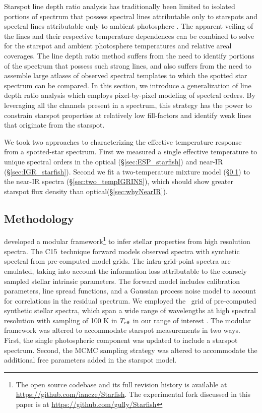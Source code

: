 \documentclass[twocolumn]{emulateapj}%
\newcommand{\iancze}{{\sc C15}}
\begin{document}
Starspot line depth ratio analysis has traditionally been limited to isolated portions of spectrum that possess spectral lines attributable only to starspots and spectral lines attributable only to ambient photosphere \citep[\emph{e.g.}][]{neff95, oneal01}.  The apparent veiling of the lines and their respective temperature dependences can be combined to solve for the starspot and ambient photosphere temperatures and relative areal coverages.  The line depth ratio method suffers from the need to identify portions of the spectrum that possess such strong lines, and also suffers from the need to assemble large atlases of observed spectral templates to which the spotted star spectrum can be compared.  In this section, we introduce a generalization of line depth ratio analysis which employs pixel-by-pixel modeling of spectral orders.  By leveraging all the channels present in a spectrum, this strategy has the power to constrain starspot properties at relatively low fill-factors and identify weak lines that originate from the starspot.

We took two approaches to characterizing the effective temperature response from a spotted-star spectrum.  First we measured a single effective temperature to unique spectral orders in the optical (\S \ref{sec:ESP_starfish}) and near-IR (\S \ref{sec:IGR_starfish}).  Second we fit a two-temperature mixture model (\S \ref{sec:methods}) to the near-IR spectra (\S \ref{sec:two_tempIGRINS}), which should show greater starspot flux density than optical(\S \ref{sec:whyNearIR}).

\subsection{Methodology}\label{sec:methods} 

\citet[hereafter \iancze]{czekala15} developed a modular framework\footnote{The open source codebase and its full revision history is available at \url{https://github.com/iancze/Starfish}.  The experimental fork discussed in this paper is at \url{https://github.com/gully/Starfish}} to infer stellar properties from high resolution spectra.  The \iancze\ technique forward models observed spectra with synthetic spectral from pre-computed model grids.  The intra-grid-point spectra are emulated, taking into account the information loss attributable to the coarsely sampled stellar intrinsic parameters.  The forward model includes calibration parameters, line spread functions, and a Gaussian process noise model to account for correlations in the residual spectrum.  We employed the \PHOENIX\ grid of pre-computed synthetic stellar spectra, which span a wide range of wavelengths at high spectral resolution with sampling of 100 K in $T_\textrm{eff}$ in our range of interest \citep{husser13}.  The modular framework was altered to accommodate starspot measurements in two ways. First, the single photospheric component was updated to include a starspot spectrum. Second, the MCMC sampling strategy was altered to accommodate the additional free parameters added in the starspot model.
\end{document}
